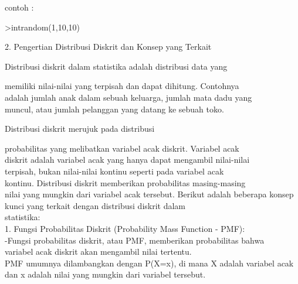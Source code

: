 \documentclass[a4paper,10pt]{article}
\begin{document}
\begin{eulernotebook}
\begin{eulercomment}
\begin{eulercomment}
\begin{eulercomment}
\begin{eulercomment}
\begin{eulercomment}
\begin{eulercomment}
\begin{eulercomment}
\begin{eulercomment}
\begin{eulercomment}
contoh :
\end{eulercomment}
\begin{eulerprompt}
>intrandom(1,10,10)
\end{eulerprompt}
\begin{euleroutput}
  [2,  4,  6,  7,  3,  3,  2,  9,  10,  2]
\end{euleroutput}
\begin{eulercomment}
\end{eulercomment}
\eulersubheading{}
\begin{eulercomment}
2. Pengertian Distribusi Diskrit dan Konsep yang Terkait

\end{eulercomment}
\begin{eulerttcomment}
       Distribusi diskrit dalam statistika adalah distribusi data yang
\end{eulerttcomment}
\begin{eulercomment}
memiliki nilai-nilai yang terpisah dan dapat dihitung. Contohnya\\
adalah jumlah anak dalam sebuah keluarga, jumlah mata dadu yang\\
muncul, atau jumlah pelanggan yang datang ke sebuah toko.\\
\end{eulercomment}
\begin{eulerttcomment}
       Distribusi diskrit merujuk pada distribusi
\end{eulerttcomment}
\begin{eulercomment}
probabilitas yang melibatkan variabel acak diskrit. Variabel acak\\
diskrit adalah variabel acak yang hanya dapat mengambil nilai-nilai\\
terpisah, bukan nilai-nilai kontinu seperti pada variabel acak\\
kontinu. Distribusi diskrit memberikan probabilitas masing-masing\\
nilai yang mungkin dari variabel acak tersebut. Berikut adalah
beberapa konsep kunci yang terkait dengan distribusi diskrit dalam\\
statistika: \\
1. Fungsi Probabilitas Diskrit (Probability Mass Function - PMF):\\
-Fungsi probabilitas diskrit, atau PMF, memberikan probabilitas bahwa\\
variabel acak diskrit akan mengambil nilai tertentu.\\
PMF umumnya dilambangkan dengan P(X=x), di mana X adalah variabel acak\\
dan x adalah nilai yang mungkin dari variabel tersebut.\\
\end{eulercomment}
\begin{eulerttcomment}
 

\end{eulerttcomment}
\end{eulercomment}
\end{eulercomment}
\end{eulercomment}
\end{eulercomment}
\end{eulercomment}
\end{eulercomment}
\end{eulercomment}
\end{eulercomment}
\end{eulernotebook}
\end{document}
